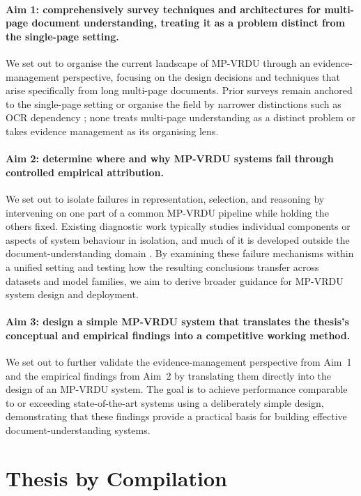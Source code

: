 \documentclass[11pt,twoside,openany]{report}
\begin{document}
\paragraph{Aim 1: comprehensively survey techniques and architectures for multi-page document understanding, treating it as a problem distinct from the single-page setting.} We set out to organise the current landscape of MP-VRDU through an evidence-management perspective, focusing on the design decisions and techniques that arise specifically from long multi-page documents. Prior surveys remain anchored to the single-page setting or organise the field by narrower distinctions such as OCR dependency \citep{ding2026survey,gao2026scaling}; none treats multi-page understanding as a distinct problem or takes evidence management as its organising lens.

\paragraph{Aim 2: determine where and why MP-VRDU systems fail through controlled empirical attribution.} We set out to isolate failures in representation, selection, and reasoning by intervening on one part of a common MP-VRDU pipeline while holding the others fixed. Existing diagnostic work typically studies individual components or aspects of system behaviour in isolation, and much of it is developed outside the document-understanding domain \citep{zhang2025ocr,shaikh2026dissecting,zarrinkia2026reasoning}. By examining these failure mechanisms within a unified setting and testing how the resulting conclusions transfer across datasets and model families, we aim to derive broader guidance for MP-VRDU system design and deployment.

\paragraph{Aim 3: design a simple MP-VRDU system that translates the thesis's conceptual and empirical findings into a competitive working method.} We set out to further validate the evidence-management perspective from Aim~1 and the empirical findings from Aim~2 by translating them directly into the design of an MP-VRDU system. The goal is to achieve performance comparable to or exceeding state-of-the-art systems using a deliberately simple design, demonstrating that these findings provide a practical basis for building effective document-understanding systems.

\section{Thesis by Compilation}
\end{document}
